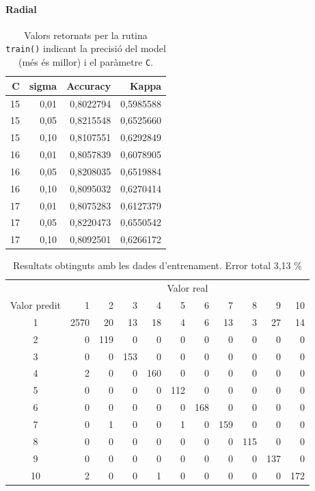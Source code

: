 \documentclass[a4paper]{article}
\begin{document}
\paragraph{Radial}

\begin{table}[H]
	\centering
	\def\arraystretch{1.2}
	\begin{tabular}{|rrrr|}
		\hline
		C & sigma & Accuracy & Kappa \\
		\hline
		15 & 0,01 & 0,8022794 & 0,5985588 \\
		15 & 0,05 & 0,8215548 & 0,6525660 \\
		15 & 0,10 & 0,8107551 & 0,6292849 \\
		16 & 0,01 & 0,8057839 & 0,6078905 \\
		16 & 0,05 & 0,8208035 & 0,6519884 \\
		16 & 0,10 & 0,8095032 & 0,6270414 \\
		17 & 0,01 & 0,8075283 & 0,6127379 \\
		\rowcolor{Orange!40}
		17 & 0,05 & 0,8220473 & 0,6550542 \\
		17 & 0,10 & 0,8092501 & 0,6266172 \\
		\hline
	\end{tabular}
	\captionsetup{width=0.6\textwidth}
	\caption{Valors retornats per la rutina \texttt{train()} indicant la precisió del model (més és millor) i el paràmetre \texttt{C}.}
\end{table}

\begin{table}[H]
	\centering
	\def\arraystretch{1.2}
	\begin{tabular}{|c|rrrrrrrrrr|}
		\hline
		& \multicolumn{10}{c|}{Valor real} \\
		Valor predit & 1 & 2 & 3 & 4 & 5 & 6 & 7 & 8 & 9 & 10 \\
		\hline
		1 & 2570 & 20 & 13 & 18 & 4 & 6 & 13 & 3 & 27 & 14 \\
		2 & 0 & 119 & 0 & 0 & 0 & 0 & 0 & 0 & 0 & 0 \\
		3 & 0 & 0 & 153 & 0 & 0 & 0 & 0 & 0 & 0 & 0 \\
		4 & 2 & 0 & 0 & 160 & 0 & 0 & 0 & 0 & 0 & 0 \\
		5 & 0 & 0 & 0 & 0 & 112 & 0 & 0 & 0 & 0 & 0 \\
		6 & 0 & 0 & 0 & 0 & 0 & 168 & 0 & 0 & 0 & 0 \\
		7 & 0 & 1 & 0 & 0 & 1 & 0 & 159 & 0 & 0 & 0 \\
		8 & 0 & 0 & 0 & 0 & 0 & 0 & 0 & 115 & 0 & 0 \\
		9 & 0 & 0 & 0 & 0 & 0 & 0 & 0 & 0 & 137 & 0 \\
		10 & 2 & 0 & 0 & 1 & 0 & 0 & 0 & 0 & 0 & 172 \\
		\hline
	\end{tabular}
	\caption{Resultats obtinguts amb les dades d'entrenament. Error total 3,13 \%}
	\label{tab:svm_radial_k1}
\end{table}
\end{document}
